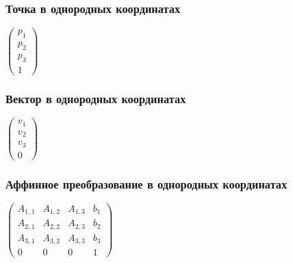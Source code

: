\documentclass[10pt]{beamer}
\begin{document}
\begin{frame}[fragile]
\frametitle{Точка в однородных координатах}
\begin{center}
\begin{math}
\begin{pmatrix}
p_1 \\
p_2 \\
p_3 \\
1
\end{pmatrix}
\end{math}
\end{center}
\end{frame}

\begin{frame}[fragile]
\frametitle{Вектор в однородных координатах}
\begin{center}
\begin{math}
\begin{pmatrix}
v_1 \\
v_2 \\
v_3 \\
0
\end{pmatrix}
\end{math}
\end{center}
\end{frame}

\begin{frame}[fragile]
\frametitle{Аффинное преобразование в однородных координатах}
\begin{center}
\begin{math}
\begin{pmatrix}
A_{1,1} & A_{1,2} & A_{1,3} & b_1 \\
A_{2,1} & A_{2,2} & A_{2,3} & b_2 \\
A_{3,1} & A_{3,2} & A_{3,3} & b_3 \\
0 & 0 & 0 & 1
\end{pmatrix}
\end{math}
\end{center}
\end{frame}
\end{document}
